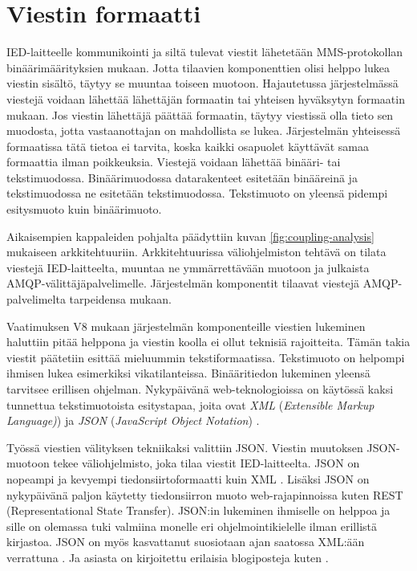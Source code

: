 \section{Viestin formaatti}
IED-laitteelle kommunikointi ja siltä tulevat viestit lähetetään MMS-protokollan binäärimäärityksien mukaan. Jotta tilaavien komponenttien olisi helppo lukea viestin sisältö, täytyy se muuntaa toiseen muotoon. Hajautetussa järjestelmässä viestejä voidaan lähettää lähettäjän formaatin tai yhteisen hyväksytyn formaatin mukaan. Jos viestin lähettäjä päättää formaatin, täytyy viestissä olla tieto sen muodosta, jotta vastaanottajan on mahdollista se lukea. Järjestelmän yhteisessä formaatissa tätä tietoa ei tarvita, koska kaikki osapuolet käyttävät samaa formaattia ilman poikkeuksia. Viestejä voidaan lähettää binääri- tai tekstimuodossa. Binäärimuodossa datarakenteet esitetään binääreinä ja tekstimuodossa ne esitetään tekstimuodossa. Tekstimuoto on yleensä pidempi esitysmuoto kuin binäärimuoto.

Aikaisempien kappaleiden pohjalta päädyttiin kuvan \ref{fig:coupling-analysis} mukaiseen arkkitehtuuriin. Arkkitehtuurissa väliohjelmiston tehtävä on tilata viestejä IED-laitteelta, muuntaa ne ymmärrettävään muotoon ja julkaista AMQP-välittäjäpalvelimelle. Järjestelmän komponentit tilaavat viestejä AMQP-palvelimelta tarpeidensa mukaan.

Vaatimuksen V8 mukaan järjestelmän komponenteille viestien lukeminen haluttiin pitää helppona ja viestin koolla ei ollut teknisiä rajoitteita. Tämän takia viestit päätetiin esittää mieluummin tekstiformaatissa. Tekstimuoto on helpompi ihmisen lukea esimerkiksi vikatilanteissa. Binääritiedon lukeminen yleensä tarvitsee erillisen ohjelman. Nykypäivänä web-teknologioissa on käytössä kaksi tunnettua tekstimuotoista esitystapaa, joita ovat \emph{XML} (\emph{Extensible Markup Language)}) \cite{xml-specification} ja \emph{JSON} (\emph{JavaScript Object Notation}) \cite{json-standard}.

Työssä viestien välityksen tekniikaksi valittiin JSON. Viestin muutoksen JSON-muotoon tekee väliohjelmisto, joka tilaa viestit IED-laitteelta. JSON on nopeampi ja kevyempi tiedonsiirtoformaatti kuin XML \cite{json-xml-comparison}. Lisäksi JSON on nykypäivänä paljon käytetty tiedonsiirron muoto web-rajapinnoissa kuten REST (Representational State Transfer). JSON:in lukeminen ihmiselle on helppoa ja sille on olemassa tuki valmiina monelle eri ohjelmointikielelle ilman erillistä kirjastoa. JSON on myös kasvattanut suosiotaan ajan saatossa XML:ään verrattuna \cite{google-trends-xml-json}. Ja asiasta on kirjoitettu erilaisia blogiposteja kuten \cite{the-rise-and-rise-of-json, why-json-is-better-than-xml, Patrizio2016}.



